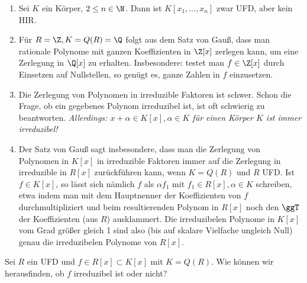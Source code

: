 \setcounter{thm}{10}
\begin{nt} \label{15.3-11}
	\begin{enumerate}[1)]
		\item
			Sei $K$ ein Körper, $2 \le n \in \N$.
			Dann ist $K[x_1, \dotsc, x_n]$ zwar UFD, aber kein HIR.
		\item
			Für $R = \Z, K = Q(R) = \Q$ folgt aus dem Satz von Gauß, dass man rationale Polynome mit ganzen Koeffizienten in $\Z[x]$ zerlegen kann, um eine Zerlegung in $\Q[x]$ zu erhalten.
			Insbesondere: testet man $f \in \Z[x]$ durch Einsetzen auf Nullstellen, so genügt es, ganze Zahlen in $f$ einzusetzen.
		\item
			Die Zerlegung von Polynomen in irreduzible Faktoren ist schwer.
			Schon die Frage, ob ein gegebenes Polynom irreduzibel ist, ist oft schwierig zu beantworten.
			\emph{Allerdings: $x + \alpha \in K[x], \alpha \in K$ für einen Körper $K$ ist immer irreduzibel!}
		\item
			Der Satz von Gauß sagt insbesondere, dass man die Zerlegung von Polynomen in $K[x]$ in irreduzible Faktoren immer auf die Zerlegung in irreduzible in $R[x]$ zurückführen kann, wenn $K = Q(R)$ und $R$ UFD.
			Ist $f \in K[x]$, so lässt sich nämlich $f$ als $\alpha f_1$ mit $f_1 \in R[x], \alpha \in K$ schreiben, etwa indem man mit dem Hauptnenner der Koeffizienten von $f$ durchmultipliziert und beim resultierenden Polynom in $R[x]$ noch den $\ggT$ der Koeffizienten (aus $R$) ausklammert.
			Die irreduzibelen Polynome in $K[x]$ vom Grad größer gleich 1 sind also (bis auf skalare Vielfache ungleich Null) genau die irreduzibelen Polynome von $R[x]$.
	\end{enumerate}
\end{nt}

Sei $R$ ein UFD und $f \in R[x] \subset K[x]$ mit $K = Q(R)$.
Wie können wir herausfinden, ob $f$ irreduzibel ist oder nicht?

